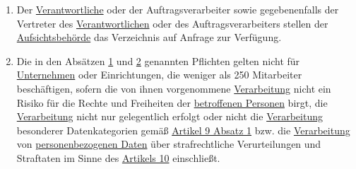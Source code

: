 \begin{enumerate}
  \item Der \hyperref[itm:04-7]{Verantwortliche} oder der Auftragsverarbeiter sowie gegebenenfalls der Vertreter des \hyperref[itm:04-7]{Verantwortlichen} oder
   des Auftragsverarbeiters stellen der \hyperref[itm:04-21]{Aufsichtsbehörde} das Verzeichnis auf Anfrage zur Verfügung.
  \label{itm:30-4}

  \item Die in den Absätzen \hyperref[itm:30-1]{1} und \hyperref[itm:30-2]{2} genannten Pflichten gelten nicht für
   \hyperref[itm:04-18]{Unternehmen} oder Einrichtungen, die weniger als 250 Mitarbeiter beschäftigen, sofern die von ihnen vorgenommene
   \hyperref[itm:04-2]{Verarbeitung} nicht ein Risiko für die Rechte und Freiheiten der \hyperref[itm:04-1]{betroffenen Personen} birgt, die \hyperref[itm:04-2]{Verarbeitung} nicht
   nur gelegentlich erfolgt oder nicht die \hyperref[itm:04-2]{Verarbeitung} besonderer Datenkategorien gemäß \hyperref[itm:09-1]{Artikel 9
   Absatz 1} bzw. die  \hyperref[itm:04-2]{Verarbeitung} von \hyperref[itm:04-1]{personenbezogenen Daten} über strafrechtliche Verurteilungen und Straftaten im
   Sinne des \hyperref[ch:10]{Artikels 10} einschließt.
  \label{itm:30-5}

\end{enumerate}



